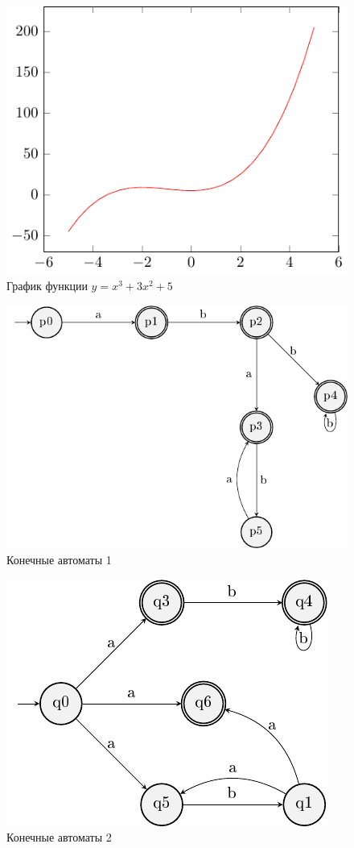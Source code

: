 	\begin{figure}[h!]
		\centering
		\includegraphics{./images/task3}
		\caption{График функции $y=x^3 + 3x^2 + 5$}
	\end{figure}
	\begin{figure}[h!]
		\centering
		\includegraphics{./images/task4_1}
		\caption{Конечные автоматы 1}
	\end{figure}
	\begin{figure}[h!]
		\centering
		\includegraphics{./images/task4_2}
		\caption{Конечные автоматы 2}
	\end{figure}


